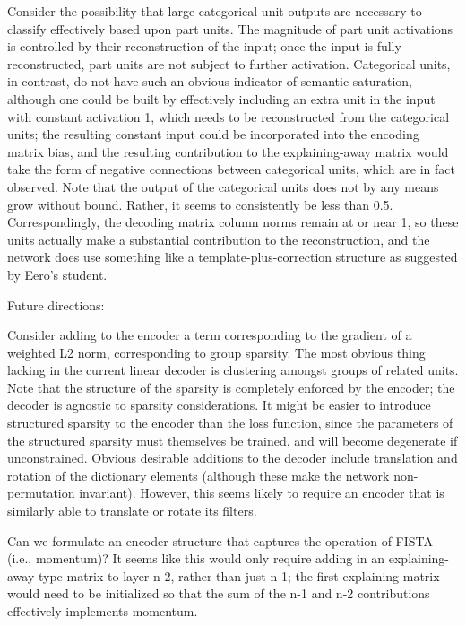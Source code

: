 Consider the possibility that large categorical-unit outputs are necessary to classify effectively based upon part units.  The magnitude of part unit activations is controlled by their reconstruction of the input; once the input is fully reconstructed, part units are not subject to further activation.  Categorical units, in contrast, do not have such an obvious indicator of semantic saturation, although one could be built by effectively including an extra unit in the input with constant activation 1, which needs to be reconstructed from the categorical units; the resulting constant input could be incorporated into the encoding matrix bias, and the resulting contribution to the explaining-away matrix would take the form of negative connections between categorical units, which are in fact observed.  Note that the output of the categorical units does not by any means grow without bound.  Rather, it seems to consistently be less than 0.5.  Correspondingly, the decoding matrix column norms remain at or near 1, so these units actually make a substantial contribution to the reconstruction, and the network does use something like a template-plus-correction structure as suggested by Eero's student.  








Future directions:

Consider adding to the encoder a term corresponding to the gradient of a weighted L2 norm, corresponding to group sparsity.  The most obvious thing lacking in the current linear decoder is clustering amongst groups of related units.  Note that the structure of the sparsity is completely enforced by the encoder; the decoder is agnostic to sparsity considerations.  It might be easier to introduce structured sparsity to the encoder than the loss function, since the parameters of the structured sparsity must themselves be trained, and will become degenerate if unconstrained.
Obvious desirable additions to the decoder include translation and rotation of the dictionary elements (although these make the network non-permutation invariant).  However, this seems likely to require an encoder that is similarly able to translate or rotate its filters.

Can we formulate an encoder structure that captures the operation of FISTA (i.e., momentum)?  It seems like this would only require adding in an explaining-away-type matrix to layer n-2, rather than just n-1; the first explaining matrix would need to be initialized so that the sum of the n-1 and n-2 contributions effectively implements momentum. 

